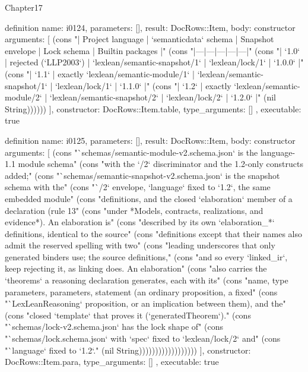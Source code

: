 \begin{lexlean}{Chapter17}
\begin{semanticmodule}
definition{
  name: i0124,
  parameters: [],
  result: DocRows::Item,
  body: constructor{
    arguments: [
      (cons "| Project language | `semanticdata` schema | Snapshot envelope | Lock schema | Builtin packages |" (cons "|---|---|---|---|---|" (cons "| `1.0` | rejected (`LLP2003`) | `lexlean/semantic-snapshot/1` | `lexlean/lock/1` | `1.0.0` |" (cons "| `1.1` | exactly `lexlean/semantic-module/1` | `lexlean/semantic-snapshot/1` | `lexlean/lock/1` | `1.1.0` |" (cons "| `1.2` | exactly `lexlean/semantic-module/2` | `lexlean/semantic-snapshot/2` | `lexlean/lock/2` | `1.2.0` |" (nil String))))))
    ],
    constructor: DocRows::Item.table,
    type_arguments: []
  },
  executable: true
}

definition{
  name: i0125,
  parameters: [],
  result: DocRows::Item,
  body: constructor{
    arguments: [
      (cons "`schemas/semantic-module-v2.schema.json` is the language-1.1 module schema" (cons "with the `/2` discriminator and the 1.2-only constructs added;" (cons "`schemas/semantic-snapshot-v2.schema.json` is the snapshot schema with the" (cons "`/2` envelope, `language` fixed to `1.2`, the same embedded module" (cons "definitions, and the closed `elaboration` member of a declaration (rule 13" (cons "under *Models, contracts, realizations, and evidence*). An elaboration is" (cons "described by its own `elaboration_*` definitions, identical to the source" (cons "definitions except that their names also admit the reserved spelling with two" (cons "leading underscores that only generated binders use; the source definitions," (cons "and so every `linked_ir`, keep rejecting it, as linking does. An elaboration" (cons "also carries the `theorems` a reasoning declaration generates, each with its" (cons "name, type parameters, parameters, statement (an ordinary proposition, a fixed" (cons "`LexLeanReasoning` proposition, or an implication between them), and the" (cons "closed `template` that proves it (`generatedTheorem`)." (cons "`schemas/lock-v2.schema.json` has the lock shape of" (cons "`schemas/lock.schema.json` with `spec` fixed to `lexlean/lock/2` and" (cons "`language` fixed to `1.2`." (nil String))))))))))))))))))
    ],
    constructor: DocRows::Item.para,
    type_arguments: []
  },
  executable: true
}


\end{semanticmodule}
\end{lexlean}
